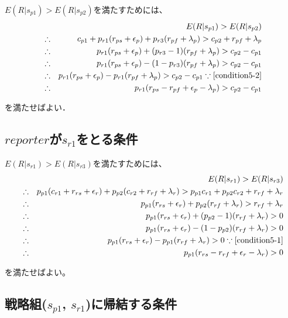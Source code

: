 $ E(R|s_{p1}) > E(R|s_{p2}) $を満たすためには、
\begin{eqnarray}
  &&E(R|s_{p1}) > E(R|s_{p2}) \nonumber \\
  &\therefore& c_{p1} + p_{r1} (r_{ps} + \epsilon_p) + p_{r3} (r_{pf} + \lambda_p) > c_{p2} + r_{pf} + \lambda_p \nonumber \\
  &\therefore& p_{r1} (r_{ps} + \epsilon_p) + (p_{r3} - 1) (r_{pf} + \lambda_p) > c_{p2} - c_{p1} \nonumber \\
  &\therefore& p_{r1} (r_{ps} + \epsilon_p) - (1 - p_{r3}) (r_{pf} + \lambda_p) > c_{p2} - c_{p1} \nonumber \\
  &\therefore& p_{r1} (r_{ps} + \epsilon_p) - p_{r1} (r_{pf} + \lambda_p) > c_{p2} - c_{p1} \because\eqref{condition5-2} \nonumber \\
  &\therefore& p_{r1} (r_{ps} - r_{pf} + \epsilon_p - \lambda_p) > c_{p2} - c_{p1}
\end{eqnarray}

を満たせばよい．

\subsection{$reporter$が$s_{r1}$をとる条件}

$ E(R|s_{r1}) > E(R|s_{r3}) $を満たすためには、
\begin{eqnarray}
  &&E(R|s_{r1}) > E(R|s_{r3}) \nonumber \\
  &\therefore& p_{p1} (c_{r1} + r_{rs} + \epsilon_r) + p_{p2} (c_{r2} + r_{rf} + \lambda_r) > p_{p1} c_{r1} + p_{p2} c_{r2} + r_{rf} + \lambda_r \nonumber \\
  &\therefore& p_{p1} (r_{rs} + \epsilon_r) + p_{p2} (r_{rf} + \lambda_r) > r_{rf} + \lambda_r \nonumber\\
  &\therefore& p_{p1} (r_{rs} + \epsilon_r) + (p_{p2} - 1) (r_{rf} + \lambda_r) > 0 \nonumber \\
  &\therefore& p_{p1} (r_{rs} + \epsilon_r) - (1 - p_{p2}) (r_{rf} + \lambda_r) > 0 \nonumber \\
  &\therefore& p_{p1} (r_{rs} + \epsilon_r) - p_{p1} (r_{rf} + \lambda_r) > 0 \because\eqref{condition5-1} \nonumber \\
  &\therefore& p_{p1}(r_{rs} - r_{rf} + \epsilon_r - \lambda_r) > 0
\end{eqnarray}

を満たせばよい。


\subsection{戦略組($s_{p1}$, $s_{r1}$)に帰結する条件}

